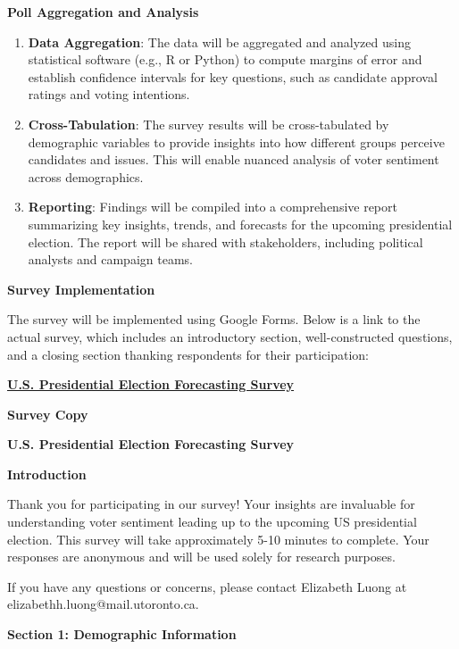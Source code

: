 \documentclass[
  letterpaper,
  DIV=11,
  numbers=noendperiod]{scrartcl}
\begin{document}
\textbf{Poll Aggregation and Analysis}

\begin{enumerate}
\def\labelenumi{\arabic{enumi}.}
\item
  \textbf{Data Aggregation}: The data will be aggregated and analyzed
  using statistical software (e.g., R or Python) to compute margins of
  error and establish confidence intervals for key questions, such as
  candidate approval ratings and voting intentions.
\item
  \textbf{Cross-Tabulation}: The survey results will be cross-tabulated
  by demographic variables to provide insights into how different groups
  perceive candidates and issues. This will enable nuanced analysis of
  voter sentiment across demographics.
\item
  \textbf{Reporting}: Findings will be compiled into a comprehensive
  report summarizing key insights, trends, and forecasts for the
  upcoming presidential election. The report will be shared with
  stakeholders, including political analysts and campaign teams.
\end{enumerate}

\textbf{Survey Implementation}

The survey will be implemented using Google Forms. Below is a link to
the actual survey, which includes an introductory section,
well-constructed questions, and a closing section thanking respondents
for their participation:

\href{https://docs.google.com/forms/d/e/1FAIpQLSdlSVq77BK3tKqsrsdLZicLx8ie0Jei1PFX3HzOGmpKxolD8w/viewform?usp=sf_link}{\textbf{U.S.
Presidential Election Forecasting Survey}}

\textbf{Survey Copy}

\textbf{U.S. Presidential Election Forecasting Survey}

\textbf{Introduction}

Thank you for participating in our survey! Your insights are invaluable
for understanding voter sentiment leading up to the upcoming US
presidential election. This survey will take approximately 5-10 minutes
to complete. Your responses are anonymous and will be used solely for
research purposes.

If you have any questions or concerns, please contact Elizabeth Luong at
elizabethh.luong@mail.utoronto.ca.

\textbf{Section 1: Demographic Information}
\end{document}
